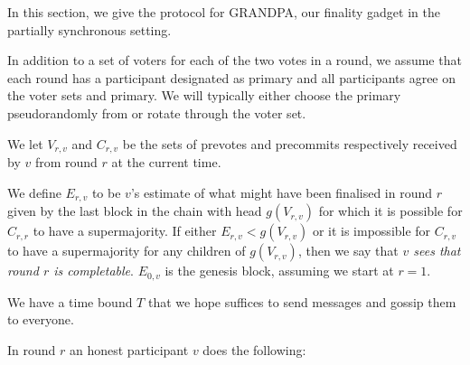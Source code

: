 \documentclass{article}
\begin{document}
In this section, we give the protocol for GRANDPA, our finality gadget in the partially synchronous setting.


In addition to a set of voters for each of the two votes in a round, we assume that each round has a participant designated as primary and all participants agree on the voter sets and primary. We will typically either choose the primary pseudorandomly from or rotate through the voter set.

We let $V_{r,v}$ and $C_{r,v}$ be the sets of prevotes and precommits respectively received by $v$ from round $r$ at the current time.

We define $E_{r,v}$ to be $v$'s estimate of what might have been finalised in round $r$ given by the last block in the chain with head $g(V_{r,v})$ for which it is possible for $C_{r,r}$ to have a supermajority.
If either $E_{r,v} < g(V_{r,v})$ or it is impossible for $C_{r,v}$ to have a supermajority for any children of $g(V_{r,v})$, then we say that {\em $v$ sees that round $r$ is completable}. $E_{0,v}$ is the genesis block, assuming we start at $r=1$.

We have a time bound $T$ that we hope suffices to send messages and gossip them to everyone. 

In round $r$ an honest participant $v$ does the following:
\end{document}
